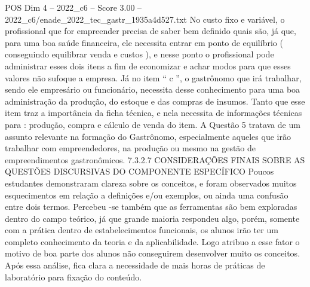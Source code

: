 \begin{textsample}{POS Dim 4 – 2022\_c6 – Score 3.00 – 2022\_c6/enade\_2022\_tec\_gastr\_1935a4d527.txt}
No custo fixo e variável, o profissional que for empreender precisa de saber bem definido quais são, já que, para uma boa saúde financeira, ele necessita entrar em ponto de equilíbrio ( conseguindo equilibrar venda e custos ), e nesse ponto o profissional pode administrar esses dois itens a fim de economizar e achar modos para que esses valores não sufoque a empresa.
Já no item “ c ”, o gastrônomo que irá trabalhar, sendo ele empresário ou funcionário, necessita desse conhecimento para uma boa administração da produção, do estoque e das compras de insumos.
Tanto que esse item traz a importância da ficha técnica, e nela necessita de informações técnicas para : produção, compra e cálculo de venda do item.
A Questão 5 tratava de um assunto relevante na formação do Gastrônomo, especialmente aqueles que irão trabalhar com empreendedores, na produção ou mesmo na gestão de empreendimentos gastronômicos. 7.3.2.7 CONSIDERAÇÕES FINAIS SOBRE AS QUESTÕES DISCURSIVAS DO COMPONENTE ESPECÍFICO Poucos estudantes demonstraram clareza sobre os conceitos, e foram observados muitos esquecimentos em relação a definições e/ou exemplos, ou ainda uma confusão entre dois termos.
Percebeu -se também que as ferramentas são bem exploradas dentro do campo teórico, já que grande maioria respondeu algo, porém, somente com a prática dentro de estabelecimentos funcionais, os alunos irão ter um completo conhecimento da teoria e da aplicabilidade.
Logo atribuo a esse fator o motivo de boa parte dos alunos não conseguirem desenvolver muito os conceitos.
Após essa análise, fica clara a necessidade de mais horas de práticas de laboratório para fixação do conteúdo.

\end{textsample}
